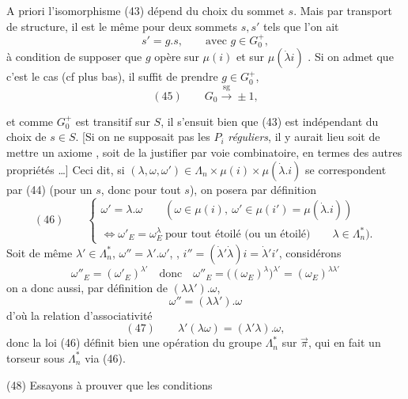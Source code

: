 \documentclass[11pt,a4paper]{article}
\begin{document}
A priori l'isomorphisme (43) dépend du choix du sommet $s$. Mais par transport de structure, il est le même pour deux sommets $s, s'$ tels que l'on ait
\[
s' = g . s, \qquad \text{avec } g \in G_0^{+},
\]
à condition de supposer que $g$ opère sur $\mu(i)$ et sur $\mu(\dot\lambda i)$ . Si on admet que c'est  le cas (cf plus bas), il suffit de prendre $g \in G_0^{+}$, \struck{\ill{}} 
\[
(45) \qquad G_0 \xrightarrow{\ \mathrm{sg}\ } \pm 1 ,
\]

et comme $G_0^{+}$ est transitif sur $S$, il s'ensuit bien que (43) est indépendant du choix de $s \in S$. [Si on ne supposait pas les $P_i$ \emph{réguliers}, il y aurait lieu soit de mettre un axiome , soit de la justifier par voie combinatoire, en termes des autres propriétés …] Ceci dit, si $(\lambda, \omega, \omega') \in \Lambda_n \times \mu(i) \times \mu(\dot\lambda . i)$ se correspondent par (44) (pour un $s$, donc pour tout $s$), on posera par définition
\[
(46) \qquad \begin{cases} \omega' = \lambda . \omega \qquad (\omega \in \mu(i),\ \omega' \in \mu(i') = \mu(\dot\lambda . i)) \\ \iff \omega'_E = \omega_E^{\lambda} \ \text{pour tout étoilé (ou un étoilé)} \qquad \lambda \in \Lambda_n^{*} ). \end{cases}
\]
Soit de même $\lambda' \in \Lambda_n^{*}$, $\omega'' = \lambda' . \omega'$, , $i'' = (\dot\lambda' \dot\lambda) i = \dot\lambda' i'$, considérons
\[
\omega''_E = (\omega'_E)^{\lambda'} \quad \text{donc} \quad \omega''_E = \bigl((\omega_E)^{\lambda}\bigr)^{\lambda'} = (\omega_E)^{\lambda\lambda'}
\]
on a donc aussi, par définition de $(\lambda\lambda') . \omega$,
\[
\omega'' = (\lambda\lambda') . \omega
\]
\struck{\ill{}} d'où la relation d'associativité
\[
(47) \qquad \lambda'(\lambda \omega) = (\lambda'\lambda) . \omega ,
\]
donc la loi (46) définit bien une opération du groupe $\Lambda_n^{*}$ sur $\vec{\pi}$, qui en fait un torseur sous $\Lambda_n^{*}$ via (46).

(48)  Essayons à prouver que les conditions
\end{document}
